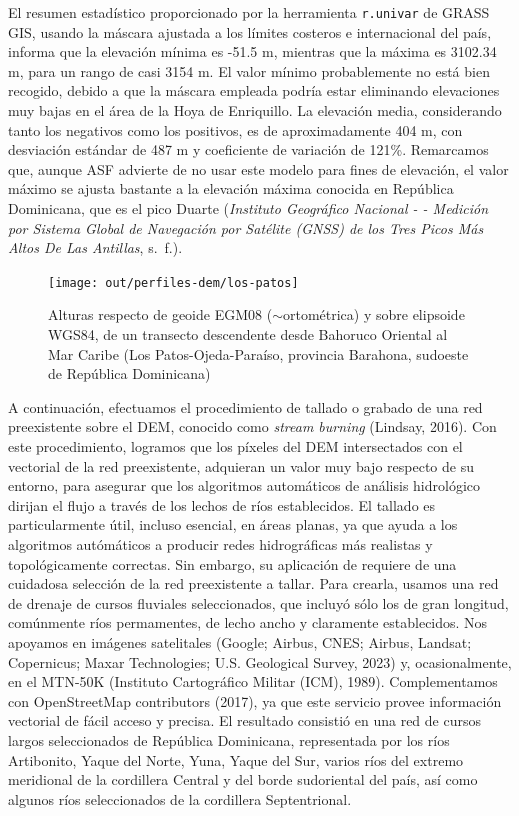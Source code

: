 \documentclass[spanish]{article}
\begin{document}
El resumen estadístico proporcionado por la herramienta
\texttt{r.univar} de GRASS GIS, usando la máscara ajustada a los límites
costeros e internacional del país, informa que la elevación mínima es
-51.5 m, mientras que la máxima es 3102.34 m, para un rango de casi 3154
m. El valor mínimo probablemente no está bien recogido, debido a que la
máscara empleada podría estar eliminando elevaciones muy bajas en el
área de la Hoya de Enriquillo. La elevación media, considerando tanto
los negativos como los positivos, es de aproximadamente 404 m, con
desviación estándar de 487 m y coeficiente de variación de 121\%.
Remarcamos que, aunque ASF advierte de no usar este modelo para fines de
elevación, el valor máximo se ajusta bastante a la elevación máxima
conocida en República Dominicana, que es el pico Duarte (\emph{Instituto
Geográfico Nacional - - Medición por Sistema Global de Navegación por
Satélite (GNSS) de los Tres Picos Más Altos De Las Antillas}, s.~f.).

\begin{figure}

{\centering \texttt{[image: out/perfiles-dem/los-patos]} 

}

\caption{Alturas respecto de geoide EGM08 ($\sim$ortométrica) y sobre elipsoide WGS84, de un transecto descendente desde Bahoruco Oriental al Mar Caribe (Los Patos-Ojeda-Paraíso, provincia Barahona, sudoeste de República Dominicana)}\label{fig:alturasgeoideelipsoide}
\end{figure}

A continuación, efectuamos el procedimiento de tallado o grabado de una
red preexistente sobre el DEM, conocido como \emph{stream burning}
(Lindsay, 2016). Con este procedimiento, logramos que los píxeles del
DEM intersectados con el vectorial de la red preexistente, adquieran un
valor muy bajo respecto de su entorno, para asegurar que los algoritmos
automáticos de análisis hidrológico dirijan el flujo a través de los
lechos de ríos establecidos. El tallado es particularmente útil, incluso
esencial, en áreas planas, ya que ayuda a los algoritmos autómáticos a
producir redes hidrográficas más realistas y topológicamente correctas.
Sin embargo, su aplicación de requiere de una cuidadosa selección de la
red preexistente a tallar. Para crearla, usamos una red de drenaje de
cursos fluviales seleccionados, que incluyó sólo los de gran longitud,
comúnmente ríos permamentes, de lecho ancho y claramente establecidos.
Nos apoyamos en imágenes satelitales (Google; Airbus, CNES; Airbus,
Landsat; Copernicus; Maxar Technologies; U.S. Geological Survey, 2023)
y, ocasionalmente, en el MTN-50K (Instituto Cartográfico Militar (ICM),
1989). Complementamos con OpenStreetMap contributors (2017), ya que este
servicio provee información vectorial de fácil acceso y precisa. El
resultado consistió en una red de cursos largos seleccionados de
República Dominicana, representada por los ríos Artibonito, Yaque del
Norte, Yuna, Yaque del Sur, varios ríos del extremo meridional de la
cordillera Central y del borde sudoriental del país, así como algunos
ríos seleccionados de la cordillera Septentrional.
\end{document}
